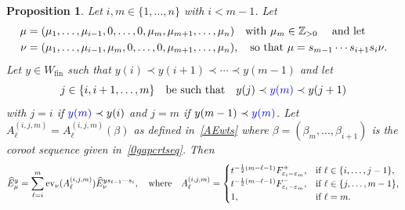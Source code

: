 \documentclass[11pt]{article}
\theoremstyle{plain}
\newtheorem{prop}[thm]{Proposition}
\theoremstyle{definition}
\theoremstyle{remark}
\numberwithin{equation}{section}
\def\ZZ{\mathbb{Z}}
\def\ev{\mathrm{ev}}
\newcounter{r}
\newcounter{s}
\begin{document}
\begin{prop} \label{0gap} 
Let $i, m\in \{1, \ldots, n\}$ with $i< m-1$.
Let 
\begin{align*}
\mu &= (\mu_1, \ldots, \mu_{i-1}, 0, \ldots, 0, \mu_m, \mu_{m+1}, \ldots, \mu_n)\quad\hbox{with $\mu_m\in \ZZ_{>0}$ \quad and let } \\
\nu &= (\mu_1, \ldots, \mu_{i-1}, \mu_m, 0, \ldots, 0, \mu_{m+1}, \ldots, \mu_n),
\quad\hbox{so that $\mu =s_{m-1}\cdots s_{i+1}s_i\nu$.}
\end{align*}
Let $y \in W_{\mathrm{fin}}$ such that $y(i) \prec y(i+1) \prec \cdots \prec y(m-1)$
and let 
$$j \in \{i, i+1, \ldots, m\}\quad\hbox{be such that}\quad
y(j) \prec {\color{blue}y(m)} \prec y(j+1)
$$
with $j=i$ if ${\color{blue} y(m)}\prec y(i)$ and $j=m$ if $y(m-1)\prec {\color{blue} y(m)}$.
Let $A^{(i,j,m)}_\ell=A^{(i,j,m)}_\ell(\beta)$ as defined in~\eqref{AEwts} where
$\beta = (\beta_m, \ldots, \beta_{i+1})$ is the coroot sequence given in~\eqref{0gapcrtseq}.
Then
$$\widehat{E}^y_\mu 
= 
\sum_{\ell = i}^m \ev_\nu(A^{(i,j,m)}_\ell) \widehat{E}^{ys_{\ell-1}\cdots s_i}_\nu,
\quad\hbox{where}\quad
A^{(i,j,m)}_\ell = \begin{cases}
t^{-\frac12(m-\ell-1)}F^+_{\varepsilon_i-\varepsilon_m}, &\hbox{if $\ell\in \{i,\ldots, j-1\}$,}  \\
t^{-\frac12(m-\ell-1)}F^-_{\varepsilon_i-\varepsilon_m}, &\hbox{if $\ell\in \{j, \ldots, m-1\}$,}  \\
1, &\hbox{if $\ell=m$.}
\end{cases}
$$
\end{prop}
\end{document}
